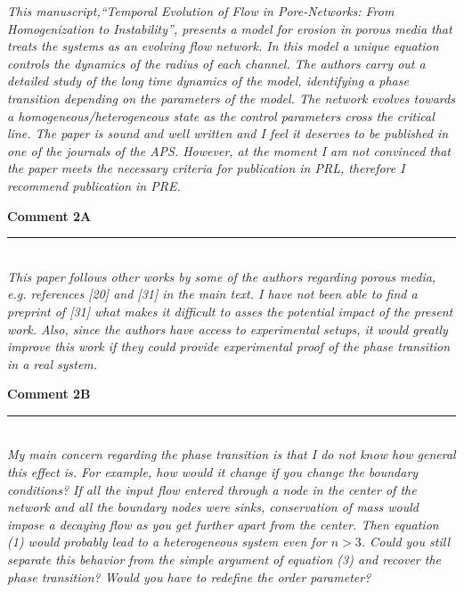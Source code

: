 \documentclass{article}
\newcommand{\Hline}{\rule{\linewidth}{.1mm}}
\newcommand{\Question}[1]{\noindent \color{black}\emph{#1}\normalcolor}
\newcommand{\Answer}[1]{\noindent {\color{blue}{ #1}}\normalcolor}
\begin{document}
\Question{This manuscript,``Temporal Evolution of Flow in Pore-Networks: From 
Homogenization to Instability'', presents a model for erosion in porous
media that treats the systems as an evolving flow network. In this
model a unique equation controls the dynamics of the radius of each
channel. The authors carry out a detailed study of the long time
dynamics of the model, identifying a phase transition depending on the
parameters of the model. The network evolves towards a
homogeneous/heterogeneous state as the control parameters cross the
critical line. The paper is sound and well written and I feel it
deserves to be published in one of the journals of the APS. However,
at the moment I am not convinced that the paper meets the necessary
criteria for publication in PRL, therefore I recommend publication in
PRE.\newline}


\Answer{We thank the reviewer for their thoughtful and thorough comments.}



\vspace{0.5cm}
\textbf{Comment 2A}
\noindent \vspace{-0.2cm}\\ \Hline\\

\Question{This paper follows other works by some of the authors regarding porous media, e.g. references [20] and [31] in the main text. I have
not been able to find a preprint of [31] what makes it difficult to
asses the potential impact of the present work. Also, since the
authors have access to experimental setups, it would greatly improve
this work if they could provide experimental proof of the phase
transition in a real system.\newline}

\Answer{We apologize for unavailability of Ref. [31]. This reference is now published and available online. The reference has been updated with publication details. With regards to the experimental tests, all the authors of the current manuscript are theorists, and experimental studies of this work is out of our scope.}
 



\vspace{0.5cm}
\textbf{Comment 2B}
\noindent \vspace{-0.2cm}\\ \Hline\\


\Question{My main concern regarding the phase transition is that I do not
know how general this effect is. For example, how would it change if
you change the boundary conditions? If all the input flow entered
through a node in the center of the network and all the boundary nodes
were sinks, conservation of mass would impose a decaying flow as you
get further apart from the center. Then equation (1) would probably
lead to a heterogeneous system even for $n>3$. Could you still
separate this behavior from the simple argument of equation (3) and
recover the phase transition? Would you have to redefine the order
parameter?\newline}
\end{document}
